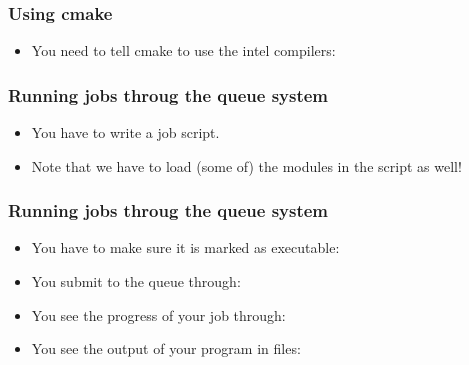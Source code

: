 \documentclass{beamer}
\begin{document}
\begin{frame}\frametitle{Using cmake}
\begin{itemize}
  \item You need to tell cmake to use the intel compilers:
    
\end{itemize}
\end{frame}
\begin{frame}\frametitle{Running jobs throug the queue system}
\begin{itemize}
   \item You have to write a job script.
     
   \item Note that we have to load (some of) the modules in the script as well!
\end{itemize}
\end{frame}
\begin{frame}\frametitle{Running jobs throug the queue system}
\begin{itemize}
   \item You have to make sure it is marked as executable:
     
   \item You submit to the queue through:
     
   \item You see the progress of your job through:
     
   \item You see the output of your program in files:
     
\end{itemize}
\end{frame}
\end{document}
